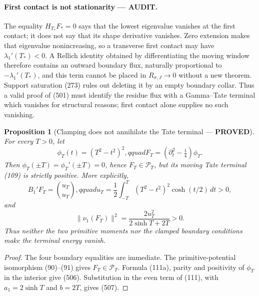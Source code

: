 \documentclass[11pt]{article}
\newtheorem{proposition}[theorem]{Proposition}
\newcommand{\PROVED}{\textcolor{green!45!black}{\textbf{PROVED}}}
\newcommand{\AUDIT}{\textcolor{orange!75!black}{\textbf{AUDIT}}}
\begin{document}
\paragraph{First contact is not stationarity --- \AUDIT.}
The equality \(H_{T_*}F_*=0\) says that the lowest eigenvalue vanishes at
the first contact; it does not say that its shape derivative vanishes.
Zero extension makes that eigenvalue nonincreasing, so a transverse first
contact may have \(\lambda_1'(T_*)<0\).  A Rellich identity obtained by
differentiating the moving window therefore contains an outward boundary
flux, naturally proportional to \(-\lambda_1'(T_*)\), and this term cannot
be placed in \(R_{\sigma,J}\to0\) without a new theorem.  Support saturation
(273) rules out deleting it by an empty boundary collar.  Thus a valid proof
of (501) must identify the residue flux with a Gamma--Tate terminal which
vanishes for structural reasons; first contact alone supplies no such
vanishing.

\begin{proposition}[Clamping does not annihilate the Tate terminal ---
\PROVED]
For every \(T>0\), let
\begin{equation}
 \phi_T(t)=(T^2-t^2)^2,qquad
 F_T=(\partial_t^2-\tfrac14)\phi_T.                  \tag{505}
\end{equation}
Then \(\phi_T(\pm T)=\phi_T'(\pm T)=0\), hence
\(F_T\in\mathcal P_T\), but its moving Tate terminal (109) is strictly
positive.  More explicitly,
\begin{equation}
 B_1'F_T=\binom{u_T}{u_T},qquad
 u_T=\frac12\int_{-T}^{T}(T^2-t^2)^2\cosh(t/2)\,dt>0,             \tag{506}
\end{equation}
and
\begin{equation}
 \|\nu_1(F_T)\|^2=\frac{2u_T^2}{2\sinh T+2T}>0.          \tag{507}
\end{equation}
Thus neither the two primitive moments nor the clamped boundary conditions
make the terminal energy vanish.
\end{proposition}

\begin{proof}
The four boundary equalities are immediate.  The primitive-potential
isomorphism (90)--(91) gives \(F_T\in\mathcal P_T\).  Formula (111a), parity
and positivity of \(\phi_T\) in the interior give (506).  Substitution in
the even term of (111), with \(a_1=2\sinh T\) and \(b=2T\), gives (507).
\end{proof}
\end{document}
